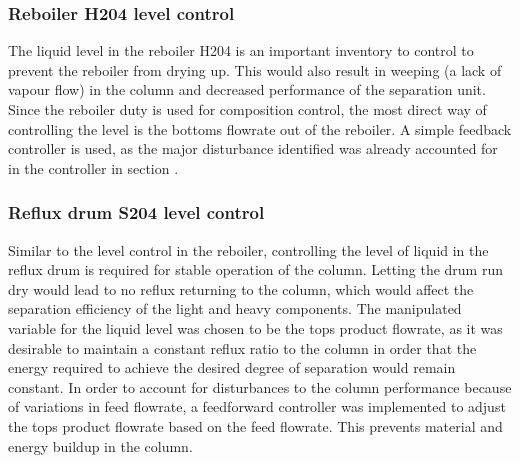 \subsubsection{Reboiler H204 level control} %
The liquid level in the reboiler H204 is an important inventory to control to prevent the reboiler from drying up. This would also result in weeping (a lack of vapour flow) in the column and decreased performance of the separation unit. Since the reboiler duty is used for composition control, the most direct way of controlling the level is the bottoms flowrate out of the reboiler. A simple feedback controller is used, as the major disturbance identified was already accounted for in the controller in section . 

\subsubsection{Reflux drum S204 level control}%
Similar to the level control in the reboiler, controlling the level of liquid in the reflux drum is required for stable operation of the column. Letting the drum run dry would lead to no reflux returning to the column, which would affect the separation efficiency of the light and heavy components. The manipulated variable for the liquid level was chosen to be the tops product flowrate, as it was desirable to maintain a constant reflux ratio to the column in order that the energy required to achieve the desired degree of separation would remain constant. In order to account for disturbances to the column performance because of variations in feed flowrate, a feedforward controller was implemented to adjust the tops product flowrate based on the feed flowrate. This prevents material and energy buildup in the column. 


